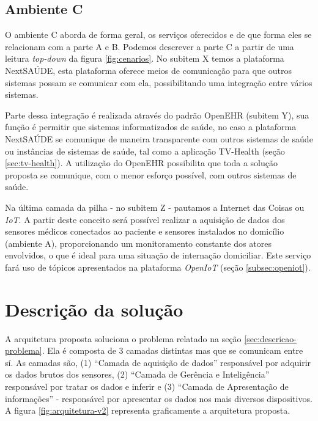 \subsection{Ambiente C} \label{subsec:ambiente-c}

O ambiente C aborda de forma geral, os serviços oferecidos e de que forma eles se
relacionam com a parte A e B. Podemos descrever a parte C a partir de uma leitura 
\textit{top-down} da figura \ref{fig:cenarios}. No subitem X temos a plataforma
NextSAÚDE, esta plataforma oferece meios de comunicação para que outros sistemas
possam se comunicar com ela, possibilitando uma integração entre vários sistemas.

Parte dessa integração é realizada através do padrão OpenEHR (subitem Y), sua 
função é permitir que sistemas informatizados de saúde, no caso a plataforma
NextSAÚDE se comunique de maneira transparente com outros sistemas de saúde ou
instâncias de sistemas de saúde, tal como a aplicação TV-Health (seção
\vref{sec:tv-health}). A utilização do OpenEHR possibilita que toda a solução
proposta se comunique, com o menor esforço possível, com outros sistemas de 
saúde.

Na última camada da pilha - no subitem Z - pautamos a Internet das Coisas ou
\textit{IoT}. A partir deste conceito será possível realizar a aquisição de
dados dos sensores médicos conectados ao paciente e sensores instalados no domicílio
(ambiente A), proporcionando um monitoramento constante dos atores envolvidos, 
o que é ideal para uma situação de internação domiciliar. Este serviço fará uso 
de tópicos apresentados na plataforma \textit{OpenIoT}
(seção \vref{subsec:openiot}).

\section{Descrição da solução}
\label{sec:descricao-solucao}

A arquitetura proposta soluciona o problema relatado na seção  
\vref{sec:descricao-problema}. Ela é composta de 3 camadas distintas mas que
se comunicam entre sí. As camadas são, (1) ``Camada de aquisição de dados''
responsável por adquirir os dados brutos dos sensores, (2) ``Camada de Gerência 
e Inteligência'' responsável por tratar os dados e inferir e (3) ``Camada de 
Apresentação de informações'' - responsável por apresentar os dados nos mais
diversos dispositivos. A figura \ref{fig:arquitetura-v2} representa graficamente
a arquitetura proposta.


